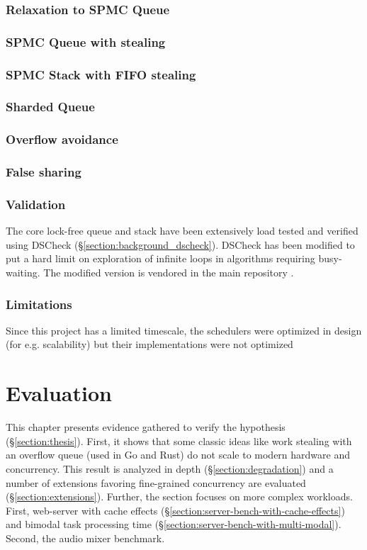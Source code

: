 \documentclass[12pt,a4paper,twoside]{report}
\begin{document}
\subsection{Relaxation to SPMC Queue}
\subsection{SPMC Queue with stealing}
\subsection{SPMC Stack with FIFO stealing}
\subsection{Sharded Queue}
\subsection{Overflow avoidance}
\subsection{False sharing}

\subsection{Validation}

The core lock-free queue and stack have been extensively load tested and verified using DSCheck (\S\ref{section:background_dscheck}). DSCheck has been modified to put a hard limit on exploration of infinite loops in algorithms requiring busy-waiting. The modified version is vendored in the main repository \cite{bartoszm90:online}.

\subsection{Limitations}

Since this project has a limited timescale, the schedulers were optimized in design (for e.g. scalability) but their implementations were not optimized 




\chapter{Evaluation}
\label{chapter:evaluation}

This chapter presents evidence gathered to verify the hypothesis (\S\ref{section:thesis}). First, it shows that some classic ideas like work stealing with an overflow queue (used in Go and Rust) do not scale to modern hardware and concurrency. This result is analyzed in depth (\S\ref{section:degradation}) and a number of extensions favoring fine-grained concurrency are evaluated (\S\ref{section:extensions}). Further, the section focuses on more complex workloads. First, web-server with cache effects (\S\ref{section:server-bench-with-cache-effects}) 
and bimodal task processing time (\S\ref{section:server-bench-with-multi-modal}). Second, the audio mixer benchmark. 
\end{document}
